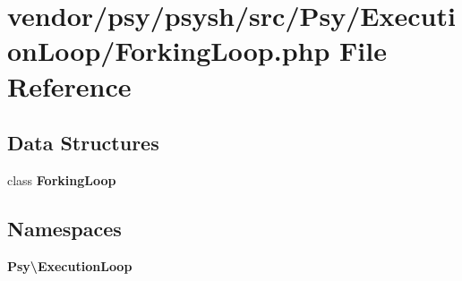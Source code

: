 \section{vendor/psy/psysh/src/\+Psy/\+Execution\+Loop/\+Forking\+Loop.php File Reference}
\label{_forking_loop_8php}
\subsection*{Data Structures}
\begin{DoxyCompactItemize}
\item 
class {\bf Forking\+Loop}
\end{DoxyCompactItemize}
\subsection*{Namespaces}
\begin{DoxyCompactItemize}
\item 
 {\bf Psy\textbackslash{}\+Execution\+Loop}
\end{DoxyCompactItemize}
